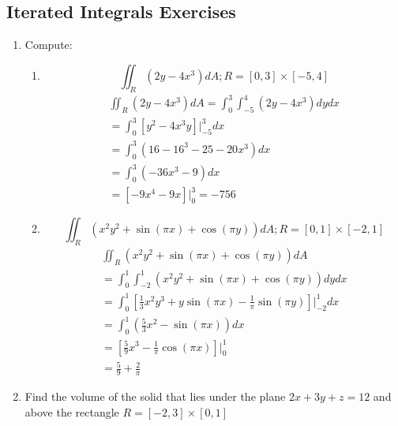 \documentclass[12pt]{article}
\begin{document}
\subsection{Iterated Integrals Exercises}
\begin{enumerate}
	\item Compute:
		\begin{enumerate}
			\item \[
					\iint_{R}(2y-4x^3)dA;R = [0,3] \times  [-5,4]
			\]
			\begin{align*}
				\label{eq:Solution A}
				\iint_{R}(2y-4x^3)dA = \int_{0}^{3} \int_{-5}^{4} (2y-4x^3)dydx\\
				= \int_{0}^{3} [y^2-4x^3y]\Big|_{-5}^3dx\\
				= \int_{0}^{3} (16-16^3 - 25 -20x^3)dx\\
				=\int_{0}^{3} (-36x^3 - 9)dx \\
				= [-9x^4 - 9x]\Big|_0^3 = -756
			\end{align*}
			\item \[
					\iint_{R}(x^2y^2 + \sin(\pi x) + \cos(\pi y))dA; R = [0,1] \times [-2,1]
			\]
			\begin{align*}
				\label{eq:Solution B}
			\iint_{R}(x^2y^2 + \sin(\pi x) + \cos(\pi y))dA \\
				= \int_{0}^{1} \int_{-2}^{1} (x^2y^2 + \sin(\pi x) + \cos(\pi y))dydx \\
				= \int_{0}^{1} [\frac{1}{3}x^2y^3 + y\sin(\pi x) - \frac{1}{\pi}\sin(\pi y)]\Big|_{-2}^1dx \\
				= \int_{0}^{1} (\frac{5}{3}x^2 - \sin(\pi x))dx \\
				= [\frac{5}{9}x^3 - \frac{1}{\pi}\cos(\pi x)]\Big|_0^1 \\
				= \frac{5}{9} + \frac{2}{\pi}
			\end{align*}
		\end{enumerate}
	\item Find the volume of the solid that lies under the plane \(2x+3y+z = 12\) and above the rectangle \(R = [-2,3] \times [0,1]\)
\end{enumerate}
\end{document}

